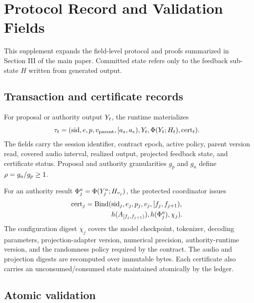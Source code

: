 \section{Protocol Record and Validation Fields}\label{supp:fields}

This supplement expands the field-level protocol and proofs summarized in
Section III of the main paper. Committed state refers only to the feedback
sub-state $H$ written from generated output.

\subsection{Transaction and certificate records}

For proposal or authority output $Y_t$, the runtime materializes
\[
 \tau_t=(\mathrm{sid},e,p,v_{\mathrm{parent}},[a_s,a_e),Y_t,
 \Phi(Y_t;H_t),\mathrm{cert}_t).
\]
The fields carry the session identifier, contract epoch, active policy, parent
version read, covered audio interval, realized output, projected feedback
state, and certificate status. Proposal and authority granularities $g_p$ and
$g_a$ define $\rho=g_a/g_p\geq1$.

For an authority result $\Phi_j^a=\Phi(Y_j^a;H_{v_j})$, the protected
coordinator issues
\[
\begin{split}
 \mathrm{cert}_j=\mathrm{Bind}(&\mathrm{sid}_j,e_j,p_j,v_j,[f_j,f_{j+1}),\\
 &h(A_{[f_j,f_{j+1})}),h(\Phi_j^a),\chi_j).
\end{split}
\]
The configuration digest $\chi_j$ covers the model checkpoint, tokenizer,
decoding parameters, projection-adapter version, numerical precision,
authority-runtime version, and the randomness policy required by the contract.
The audio and projection digests are recomputed over immutable bytes. Each
certificate also carries an unconsumed/consumed state maintained atomically by
the ledger.

\subsection{Atomic validation}

